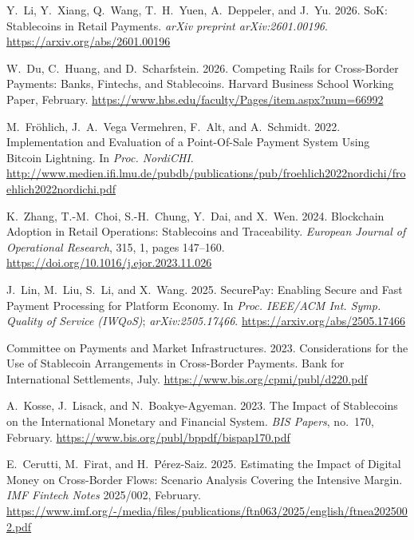 \documentclass[12pt, a4paper]{report}
\begin{document}
{\begin{enumerate}[label={[\arabic*]}]
\item Y.~Li, Y.~Xiang, Q.~Wang, T.~H.~Yuen, A.~Deppeler, and J.~Yu. 2026. SoK: Stablecoins in Retail Payments. \emph{arXiv preprint arXiv:2601.00196}. \url{https://arxiv.org/abs/2601.00196}

\item W.~Du, C.~Huang, and D.~Scharfstein. 2026. Competing Rails for Cross-Border Payments: Banks, Fintechs, and Stablecoins. Harvard Business School Working Paper, February. \url{https://www.hbs.edu/faculty/Pages/item.aspx?num=66992}

\item M.~Fr\"{o}hlich, J.~A.~Vega Vermehren, F.~Alt, and A.~Schmidt. 2022. Implementation and Evaluation of a Point-Of-Sale Payment System Using Bitcoin Lightning. In \emph{Proc. NordiCHI}. \url{http://www.medien.ifi.lmu.de/pubdb/publications/pub/froehlich2022nordichi/froehlich2022nordichi.pdf}

\item K.~Zhang, T.-M.~Choi, S.-H.~Chung, Y.~Dai, and X.~Wen. 2024. Blockchain Adoption in Retail Operations: Stablecoins and Traceability. \emph{European Journal of Operational Research}, 315, 1, pages 147--160. \url{https://doi.org/10.1016/j.ejor.2023.11.026}

\item J.~Lin, M.~Liu, S.~Li, and X.~Wang. 2025. SecurePay: Enabling Secure and Fast Payment Processing for Platform Economy. In \emph{Proc. IEEE/ACM Int. Symp. Quality of Service (IWQoS)}; \emph{arXiv:2505.17466}. \url{https://arxiv.org/abs/2505.17466}

\item Committee on Payments and Market Infrastructures. 2023. Considerations for the Use of Stablecoin Arrangements in Cross-Border Payments. Bank for International Settlements, July. \url{https://www.bis.org/cpmi/publ/d220.pdf}

\item A.~Kosse, J.~Lisack, and N.~Boakye-Agyeman. 2023. The Impact of Stablecoins on the International Monetary and Financial System. \emph{BIS Papers}, no.~170, February. \url{https://www.bis.org/publ/bppdf/bispap170.pdf}

\item E.~Cerutti, M.~Firat, and H.~P\'{e}rez-Saiz. 2025. Estimating the Impact of Digital Money on Cross-Border Flows: Scenario Analysis Covering the Intensive Margin. \emph{IMF Fintech Notes} 2025/002, February. \url{https://www.imf.org/-/media/files/publications/ftn063/2025/english/ftnea2025002.pdf}


\end{enumerate}}
\end{document}

